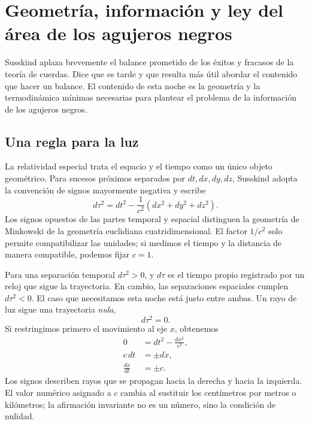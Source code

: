 \chapter{Geometría, información y ley del área de los agujeros negros}


Susskind aplaza brevemente el balance prometido de los éxitos y fracasos de la teoría de cuerdas. Dice que es tarde y que resulta más útil abordar el contenido que hacer un balance. El contenido de esta noche es la geometría y la termodinámica mínimas necesarias para plantear el problema de la información de los agujeros negros.

\section{Una regla para la luz}

La relatividad especial trata el espacio y el tiempo como un único objeto geométrico. Para sucesos próximos separados por \(dt,dx,dy,dz\), Susskind adopta la convención de signos mayormente negativa y escribe
\begin{equation}
d\tau^2=dt^2-\frac{1}{c^2}\left(dx^2+dy^2+dz^2\right).
\end{equation}
Los signos opuestos de las partes temporal y espacial distinguen la geometría de Minkowski de la geometría euclidiana cuatridimensional. El factor \(1/c^2\) solo permite compatibilizar las unidades; si medimos el tiempo y la distancia de manera compatible, podemos fijar \(c=1\).

Para una separación temporal \(d\tau^2>0\), y \(d\tau\) es el tiempo propio registrado por un reloj que sigue la trayectoria. En cambio, las separaciones espaciales cumplen \(d\tau^2<0\). El caso que necesitamos esta noche está justo entre ambas. Un rayo de luz sigue una trayectoria \emph{nula},
\begin{equation}
d\tau^2=0.
\end{equation}
Si restringimos primero el movimiento al eje \(x\), obtenemos
\begin{align}
0&=dt^2-\frac{dx^2}{c^2},\\
c\,dt&=\pm dx,\\
\frac{dx}{dt}&=\pm c.
\end{align}
Los signos describen rayos que se propagan hacia la derecha y hacia la izquierda. El valor numérico asignado a \(c\) cambia al sustituir los centímetros por metros o kilómetros; la afirmación invariante no es un número, sino la condición de nulidad.

